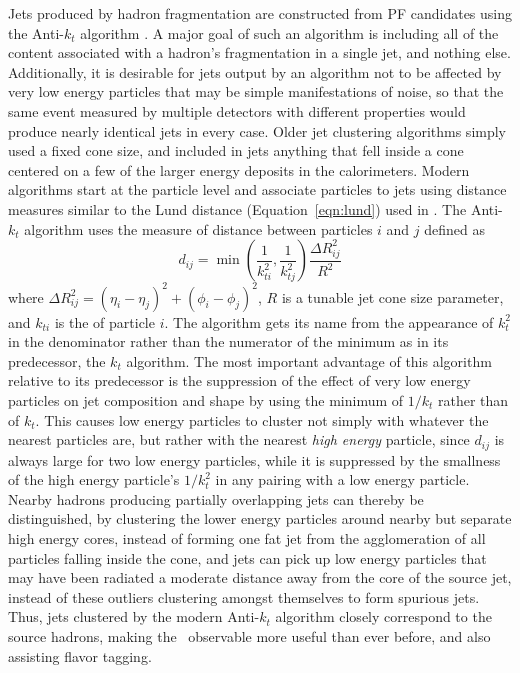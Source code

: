   Jets produced by hadron fragmentation are constructed from PF candidates using the Anti-$k_t$ algorithm \cite{antikt}.
  A major goal of such an algorithm is including all of the content associated with a hadron's fragmentation in a single jet, and nothing else.
  Additionally, it is desirable for jets output by an algorithm not to be affected by very low energy particles that may be simple manifestations of noise, so that the same event measured by multiple detectors with different properties would produce nearly identical jets in every case.
  Older jet clustering algorithms simply used a fixed cone size, and included in jets anything that fell inside a cone centered on a few of the larger energy deposits in the calorimeters.
  Modern algorithms start at the particle level and associate particles to jets using distance measures similar to the Lund distance (Equation~\ref{eqn:lund}) used in \mttwo.
  The Anti-$k_t$ algorithm uses the measure of distance between particles $i$ and $j$ defined as
  \begin{equation} \label{eqn:antikt}
    d_{ij} = \min\left(\frac{1}{k_{ti}^2},\frac{1}{k_{tj}^2}\right)\frac{\Delta R_{ij}^2}{R^2}
  \end{equation}
  where $\Delta R_{ij}^2=(\eta_i-\eta_j)^2 + (\phi_i-\phi_j)^2$, $R$ is a tunable jet cone size parameter, and $k_{ti}$ is the \pt of particle $i$.
  The algorithm gets its name from the appearance of $k_t^2$ in the denominator rather than the numerator of the minimum as in its predecessor, the $k_t$ algorithm.
  The most important advantage of this algorithm relative to its predecessor is the suppression of the effect of very low energy particles on jet composition and shape by using the minimum of $1/k_t$ rather than of $k_t$.
  This causes low energy particles to cluster not simply with whatever the nearest particles are, but rather with the nearest {\it high energy} particle, since $d_{ij}$ is always large for two low energy particles, while it is suppressed by the smallness of the high energy particle's $1/k_t^2$ in any pairing with a low energy particle.
  Nearby hadrons producing partially overlapping jets can thereby be distinguished, by clustering the lower energy particles around nearby but separate high energy cores, instead of forming one fat jet from the agglomeration of all particles falling inside the cone, and jets can pick up low energy particles that may have been radiated a moderate distance away from the core of the source jet, instead of these outliers clustering amongst themselves to form spurious jets.
  Thus, jets clustered by the modern Anti-$k_t$ algorithm closely correspond to the source hadrons, making the \njet~observable more useful than ever before, and also assisting flavor tagging.

